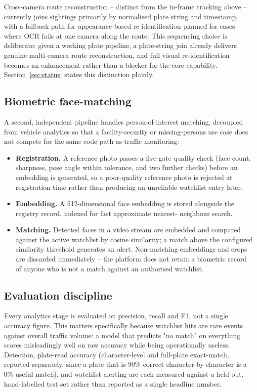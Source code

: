 \documentclass[11pt,a4paper]{article}
\begin{document}
Cross-camera route reconstruction -- distinct from the in-frame tracking
above -- currently joins sightings primarily by normalised plate string and
timestamp, with a fallback path for appearance-based re-identification
planned for cases where OCR fails at one camera along the route. This
sequencing choice is deliberate: given a working plate pipeline, a
plate-string join already delivers genuine multi-camera route
reconstruction, and full visual re-identification becomes an enhancement
rather than a blocker for the core capability. Section~\ref{sec:status}
states this distinction plainly.

\subsection{Biometric face-matching}

A second, independent pipeline handles person-of-interest matching,
decoupled from vehicle analytics so that a facility-security or
missing-persons use case does not compete for the same code path as
traffic monitoring:

\begin{itemize}
\item \textbf{Registration.} A reference photo passes a five-gate quality
  check (face count, sharpness, pose angle within tolerance, and two
  further checks) before an embedding is generated, so a poor-quality
  reference photo is rejected at registration time rather than producing an
  unreliable watchlist entry later.
\item \textbf{Embedding.} A 512-dimensional face embedding is stored
  alongside the registry record, indexed for fast approximate nearest-
  neighbour search.
\item \textbf{Matching.} Detected faces in a video stream are embedded and
  compared against the active watchlist by cosine similarity; a match above
  the configured similarity threshold generates an alert. Non-matching
  embeddings and crops are discarded immediately -- the platform does not
  retain a biometric record of anyone who is not a match against an
  authorised watchlist.
\end{itemize}

\subsection{Evaluation discipline}

Every analytics stage is evaluated on precision, recall and F1, not a
single accuracy figure. This matters specifically because watchlist hits
are rare events against overall traffic volume: a model that predicts "no
match" on everything scores misleadingly well on raw accuracy while being
operationally useless. Detection, plate-read accuracy (character-level and
full-plate exact-match, reported separately, since a plate that is
90\% correct character-by-character is a 0\% useful match), and watchlist
alerting are each measured against a held-out, hand-labelled test set
rather than reported as a single headline number.
\end{document}
